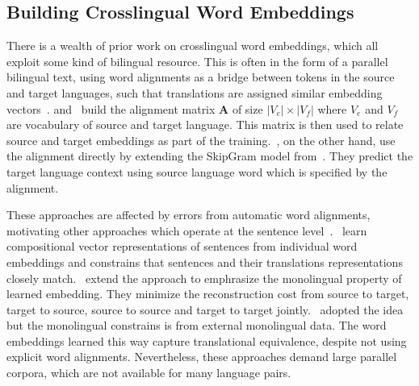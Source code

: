 \documentclass[12pt,twoside,final,hidelinks]{ltthesis}
\theoremstyle{definition}
\newcommand{\tofix}[1]{\hl{#1}}
\begin{document}


\subsection{Building Crosslingual Word Embeddings}

There is a wealth of prior work on crosslingual word embeddings, which all exploit some kind of bilingual resource.
This is often in the form of a parallel bilingual text, using word alignments as a bridge between tokens in the source and target languages, such that translations are assigned similar embedding vectors~\cite{Luong-etal:naacl15:bivec,klementiev-titov-bhattarai:2012,zou-EtAl:2013:EMNLP}. 
 and~ build the alignment matrix $\textbf{A}$ of size $|V_e| \times |V_f|$ where $V_e$ and $V_f$ are vocabulary of source and target language. This matrix is then used to relate source and target embeddings as part of the training.~, on the other hand, use the alignment directly by extending the SkipGram model from~. They predict the target language context using source language word which is specified by the alignment. 

These approaches are affected by errors from automatic word alignments, motivating other approaches which operate at the sentence level~\cite{Chandar-nips-14,DBLP:journals/corr/HermannB14,icml2015_gouws15}.~ learn compositional vector representations of sentences from 
individual word embeddings and constrains that sentences and their translations representations closely match.~ extend the approach to 
emphrasize the monolingual property of learned embedding. They minimize the reconstruction cost from source to target, target to source, source to source and target 
to target jointly.~ adopted the idea but the monolingual constrains is from external monolingual data. The word embeddings learned this 
way capture translational equivalence, despite not using explicit word alignments. Nevertheless, these approaches demand large parallel corpora, which are not 
available for many language pairs.
\end{document}
